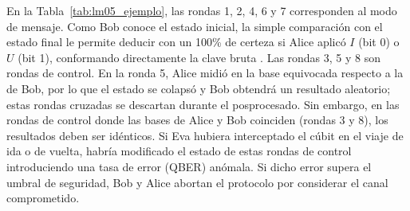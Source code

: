 En la Tabla~\ref{tab:lm05_ejemplo}, las rondas 1, 2, 4, 6 y 7 corresponden al modo de mensaje. Como Bob conoce el estado inicial, la simple comparación con el estado final le permite deducir con un 100\% de certeza si Alice aplicó $I$ (bit 0) o $U$ (bit 1), conformando directamente la clave bruta \citep{lucamarini2005}. Las rondas 3, 5 y 8 son rondas de control. En la ronda 5, Alice midió en la base equivocada respecto a la de Bob, por lo que el estado se colapsó y Bob obtendrá un resultado aleatorio; estas rondas cruzadas se descartan durante el posprocesado. Sin embargo, en las rondas de control donde las bases de Alice y Bob coinciden (rondas 3 y 8), los resultados deben ser idénticos. Si Eva hubiera interceptado el cúbit en el viaje de ida o de vuelta, habría modificado el estado de estas rondas de control introduciendo una tasa de error (QBER) anómala. Si dicho error supera el umbral de seguridad, Bob y Alice abortan el protocolo por considerar el canal comprometido.
